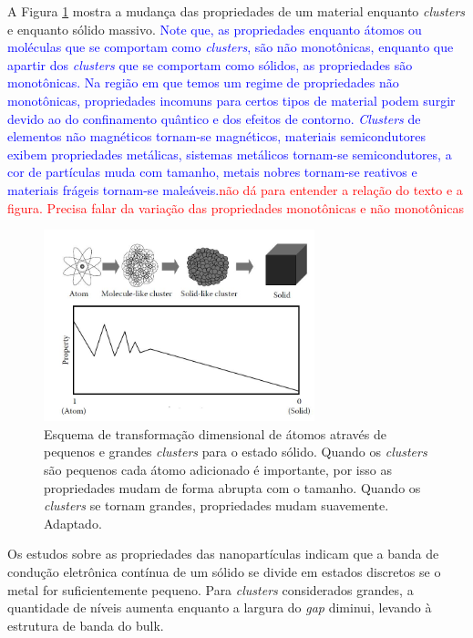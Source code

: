 A Figura \ref{fig:transicao_cluster_solido} mostra a mudança das propriedades de um material enquanto \textit{clusters} e enquanto sólido massivo. \textcolor{blue}{Note que, as propriedades enquanto átomos ou moléculas que se comportam como \textit{clusters}, são não monotônicas, enquanto que apartir dos \textit{clusters} que se comportam como sólidos, as propriedades são monotônicas. Na região em que temos um regime de propriedades não monotônicas, propriedades incomuns para certos tipos de material podem surgir devido ao do confinamento quântico e dos efeitos de contorno. \textit{Clusters} de elementos não magnéticos tornam-se magnéticos, materiais semicondutores exibem propriedades metálicas, sistemas metálicos tornam-se semicondutores, a cor de partículas muda com tamanho, metais nobres tornam-se reativos e materiais frágeis tornam-se maleáveis.}\textcolor{red}{não dá para entender a relação do texto e a figura. Precisa falar da variação das propriedades monotônicas e não monotônicas}

\begin{figure}
  \centering
  \includegraphics[width=0.7\textwidth]{images/clusters/atomo_cluste_solido}
  \caption{Esquema de transformação dimensional de átomos através de pequenos e grandes \textit{clusters} para o estado sólido. Quando os \textit{clusters} são pequenos cada átomo adicionado é importante, por isso as propriedades mudam
de forma abrupta com o tamanho. Quando os \textit{clusters} se tornam grandes,
propriedades mudam suavemente\cite{cap06_Nanophysics}. Adaptado.  }
  \label{fig:transicao_cluster_solido}
\end{figure}


Os estudos sobre as propriedades das nanopartículas indicam que a banda de condução eletrônica contínua de um sólido se divide em estados discretos se o metal for suficientemente pequeno. Para \textit{clusters} considerados grandes, a quantidade de níveis aumenta enquanto a largura do \textit{gap} diminui, levando à estrutura de banda do bulk.


